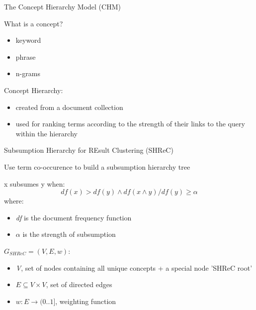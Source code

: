 \begin{frame}{The Concept Hierarchy Model (CHM)}

What is a concept?
\begin{itemize}
	\item keyword
	\item phrase
	\item n-grams \newline
\end{itemize}

Concept Hierarchy:
\begin{itemize}
	\item created from a document collection
	\item used for ranking terms according to the strength of their links to the query within the hierarchy
\end{itemize}

\end{frame}


\begin{frame}{Subsumption Hierarchy for REsult Clustering (SHReC)}

Use term co-occurence to build a subsumption hierarchy tree \newline

x subsumes y when:
\[
	df(x) > df(y) \land df(x \land y) / df(y) \geq \alpha
\]
where:
\begin{itemize}
	\item \emph{df} is the document frequency function
	\item \emph{$ \alpha $} is the strength of subsumption \newline
\end{itemize}

$ G_{SHReC} = (V, E, w) $:
\begin{itemize}
	\item \emph{V}, set of nodes containing all unique concepts + a special node 'SHReC root'
	\item $ E \subseteq V \times V $, set of directed edges
	\item $ w : E \rightarrow (0..1] $, weighting function 
\end{itemize}

\end{frame}


